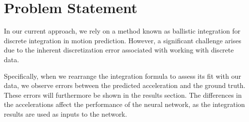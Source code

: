 \section{Problem Statement}
In our current approach, we rely on a method known as ballistic integration for discrete integration in motion prediction. 
However, a significant challenge arises due to the inherent discretization error associated with working with discrete data.

Specifically, when we rearrange the integration formula to assess its fit with our data, we observe errors between the predicted acceleration and the ground truth.
These errors will furthermore be shown in the results section.
The differences in the accelerations affect the performance of the neural network, as the integration results are used as inputs to the network.


